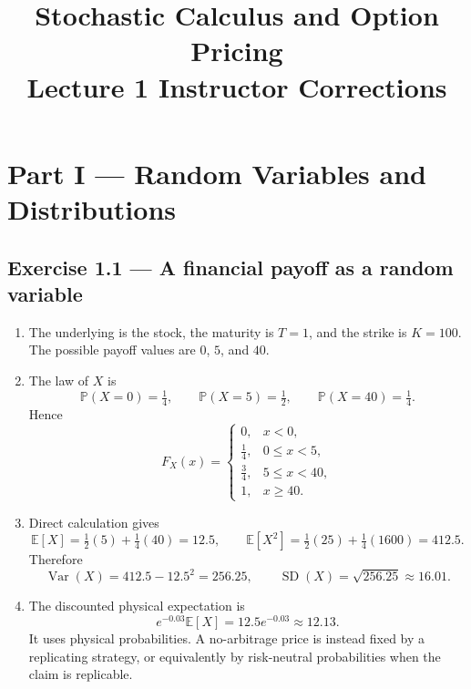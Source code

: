 \documentclass[11pt]{article}
\title{Stochastic Calculus and Option Pricing\\Lecture 1 Instructor Corrections}
\author{}
\date{}
\newcommand{\Pb}{\mathbb{P}}
\newcommand{\E}{\mathbb{E}}
\newcommand{\1}{\mathbf{1}}
\begin{document}
\maketitle
\vspace{-1em}

\section*{Part I --- Random Variables and Distributions}

\subsection*{Exercise 1.1 --- A financial payoff as a random variable}
\begin{enumerate}
  \item The underlying is the stock, the maturity is $T=1$, and the strike is
  $K=100$. The possible payoff values are $0$, $5$, and $40$.
  \item The law of $X$ is
  \[
  \Pb(X=0)=\tfrac14,\qquad
  \Pb(X=5)=\tfrac12,\qquad
  \Pb(X=40)=\tfrac14.
  \]
  Hence
  \[
  F_X(x)=
  \begin{cases}
  0,&x<0,\\
  \tfrac14,&0\le x<5,\\
  \tfrac34,&5\le x<40,\\
  1,&x\ge40.
  \end{cases}
  \]
  \item Direct calculation gives
  \[
  \E[X]=\tfrac12(5)+\tfrac14(40)=12.5,
  \qquad
  \E[X^2]=\tfrac12(25)+\tfrac14(1600)=412.5.
  \]
  Therefore
  \[
  \operatorname{Var}(X)=412.5-12.5^2=256.25,
  \qquad
  \operatorname{SD}(X)=\sqrt{256.25}\approx16.01.
  \]
  \item The discounted physical expectation is
  \[
  e^{-0.03}\E[X]=12.5e^{-0.03}\approx12.13.
  \]
  It uses physical probabilities. A no-arbitrage price is instead fixed by a
  replicating strategy, or equivalently by risk-neutral probabilities when
  the claim is replicable.
\end{enumerate}
\end{document}
